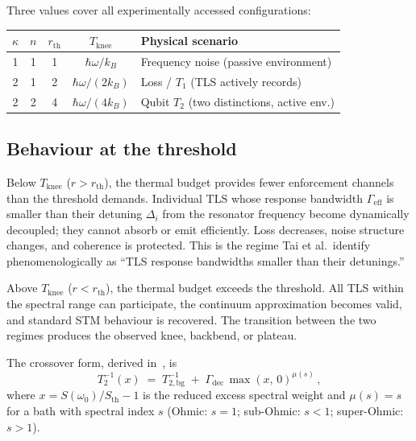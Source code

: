 \documentclass[11pt]{article}
\begin{document}
Three values cover all experimentally accessed configurations:
\begin{center}
\renewcommand{\arraystretch}{1.3}
\begin{tabular}{ccccl}
\toprule
$\kappa$ & $n$ & $r_{\mathrm{th}}$ & $T_{\mathrm{knee}}$ & Physical scenario \\
\midrule
1 & 1 & 1 & $\hbar\omega/k_B$ & Frequency noise (passive environment) \\
2 & 1 & 2 & $\hbar\omega/(2k_B)$ & Loss / $T_1$ (TLS actively records) \\
2 & 2 & 4 & $\hbar\omega/(4k_B)$ & Qubit $T_2$ (two distinctions, active env.) \\
\bottomrule
\end{tabular}
\end{center}

\subsection{Behaviour at the threshold}

Below $T_{\mathrm{knee}}$ ($r > r_{\mathrm{th}}$), the thermal budget provides fewer enforcement channels than the threshold demands.  Individual TLS whose response bandwidth $\Gamma_{\mathrm{eff}}$ is smaller than their detuning $\Delta_i$ from the resonator frequency become dynamically decoupled; they cannot absorb or emit efficiently.  Loss decreases, noise structure changes, and coherence is protected.  This is the regime Tai et al.\ identify phenomenologically as ``TLS response bandwidths smaller than their detunings.''

Above $T_{\mathrm{knee}}$ ($r < r_{\mathrm{th}}$), the thermal budget exceeds the threshold.  All TLS within the spectral range can participate, the continuum approximation becomes valid, and standard STM behaviour is recovered.  The transition between the two regimes produces the observed knee, backbend, or plateau.

The crossover form, derived in~\cite{Brooke_P1}, is
\begin{equation}\label{eq:crossover}
T_2^{-1}(x) \;=\; T_{2,\mathrm{bg}}^{-1} \;+\; \Gamma_{\mathrm{dec}}\,\max(x,\,0)^{\mu(s)}\,,
\end{equation}
where $x = S(\omega_0)/S_{\mathrm{th}} - 1$ is the reduced excess spectral weight and $\mu(s) = s$ for a bath with spectral index $s$ (Ohmic: $s = 1$; sub-Ohmic: $s < 1$; super-Ohmic: $s > 1$).

\end{document}
